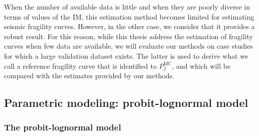 When the number of available data is little and when they are poorly diverse in terms of values of the IM, this estimation method becomes limited for estimating seismic fragility curves. However, in the other case, we consider that it provides a robust result. %
For this reason, while this thesis address the estimation of fragility curves when few data are available, we will evaluate our methods on case studies for which a large validation dataset exists.
The latter is used to derive what we call a reference fragility curve that is identified to $P^{\text{MC}}_f$, and which will be compared with the estimates provided by our methods.










\subsection{Parametric modeling: probit-lognormal model}\label{sec:intro-frags:subsec-parametric}

\subsubsection{The probit-lognormal model}


